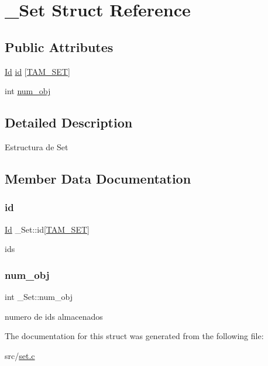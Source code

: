 \hypertarget{struct__Set}{}\section{\+\_\+\+Set Struct Reference}
\label{struct__Set}
\subsection*{Public Attributes}
\begin{DoxyCompactItemize}
\item 
\hyperlink{types_8h_a845e604fb28f7e3d97549da3448149d3}{Id} \hyperlink{struct__Set_aaa814a92620bfdb539ed25be204a3079}{id} \mbox{[}\hyperlink{set_8h_a24b51e1a036e3b382adcc8216239aafd}{T\+A\+M\+\_\+\+S\+ET}\mbox{]}
\item 
int \hyperlink{struct__Set_a6d4c5bc1c085564602a0e93fe074ad91}{num\+\_\+obj}
\end{DoxyCompactItemize}


\subsection{Detailed Description}
Estructura de Set 

\subsection{Member Data Documentation}
\mbox{\label{struct__Set_aaa814a92620bfdb539ed25be204a3079}} 
\subsubsection{\texorpdfstring{id}{id}}
{\footnotesize\ttfamily \hyperlink{types_8h_a845e604fb28f7e3d97549da3448149d3}{Id} \+\_\+\+Set\+::id\mbox{[}\hyperlink{set_8h_a24b51e1a036e3b382adcc8216239aafd}{T\+A\+M\+\_\+\+S\+ET}\mbox{]}}

ids \mbox{\label{struct__Set_a6d4c5bc1c085564602a0e93fe074ad91}} 
\subsubsection{\texorpdfstring{num\+\_\+obj}{num\_obj}}
{\footnotesize\ttfamily int \+\_\+\+Set\+::num\+\_\+obj}

numero de ids almacenados 

The documentation for this struct was generated from the following file\+:\begin{DoxyCompactItemize}
\item 
src/\hyperlink{set_8c}{set.\+c}\end{DoxyCompactItemize}
